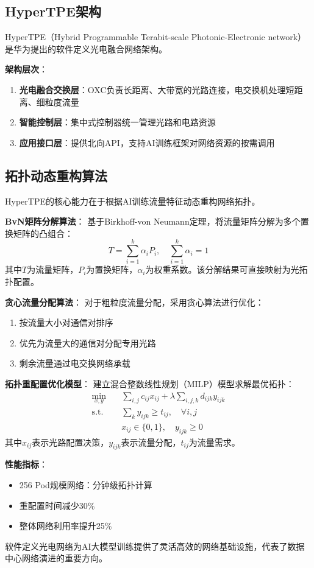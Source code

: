 \subsection{HyperTPE架构}

HyperTPE（Hybrid Programmable Terabit-scale Photonic-Electronic network）是华为提出的软件定义光电融合网络架构。

\textbf{架构层次}：
\begin{enumerate}
    \item \textbf{光电融合交换层}：OXC负责长距离、大带宽的光路连接，电交换机处理短距离、细粒度流量
    \item \textbf{智能控制层}：集中式控制器统一管理光路和电路资源
    \item \textbf{应用接口层}：提供北向API，支持AI训练框架对网络资源的按需调用
\end{enumerate}

\subsection{拓扑动态重构算法}

HyperTPE的核心能力在于根据AI训练流量特征动态重构网络拓扑。

\textbf{BvN矩阵分解算法}：
基于Birkhoff-von Neumann定理，将流量矩阵分解为多个置换矩阵的凸组合：
\begin{equation}
    T = \sum_{i=1}^{k} \alpha_i P_i, \quad \sum_{i=1}^{k} \alpha_i = 1
\end{equation}
其中$T$为流量矩阵，$P_i$为置换矩阵，$\alpha_i$为权重系数。该分解结果可直接映射为光拓扑配置。

\textbf{贪心流量分配算法}：
对于粗粒度流量分配，采用贪心算法进行优化：
\begin{enumerate}
    \item 按流量大小对通信对排序
    \item 优先为流量大的通信对分配专用光路
    \item 剩余流量通过电交换网络承载
\end{enumerate}

\textbf{拓扑重配置优化模型}：
建立混合整数线性规划（MILP）模型求解最优拓扑：
\begin{align}
    \min_{x,y} \quad & \sum_{i,j} c_{ij}x_{ij} + \lambda \sum_{i,j,k} d_{ijk}y_{ijk} \\
    \text{s.t.} \quad & \sum_{k} y_{ijk} \geq t_{ij}, \quad \forall i,j \\
    & x_{ij} \in \{0,1\}, \quad y_{ijk} \geq 0
\end{align}
其中$x_{ij}$表示光路配置决策，$y_{ijk}$表示流量分配，$t_{ij}$为流量需求。

\textbf{性能指标}：
\begin{itemize}
    \item 256 Pod规模网络：分钟级拓扑计算
    \item 重配置时间减少30\%
    \item 整体网络利用率提升25\%
\end{itemize}

软件定义光电网络为AI大模型训练提供了灵活高效的网络基础设施，代表了数据中心网络演进的重要方向。
